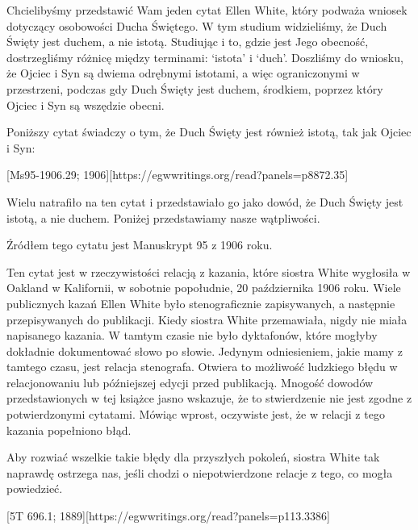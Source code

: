 \label{appendix:unauthenticated-reports}
Chcielibyśmy przedstawić Wam jeden cytat Ellen White, który podważa wniosek dotyczący osobowości Ducha Świętego. W tym studium widzieliśmy, że Duch Święty jest duchem, a nie istotą. Studiując  i to, gdzie jest Jego obecność, dostrzegliśmy różnicę między terminami: ‘istota’ i ‘duch’. Doszliśmy do wniosku, że Ojciec i Syn są dwiema odrębnymi istotami, a więc ograniczonymi w przestrzeni, podczas gdy Duch Święty jest duchem, środkiem, poprzez który Ojciec i Syn są wszędzie obecni.

Poniższy cytat świadczy o tym, że Duch Święty jest również istotą, tak jak Ojciec i Syn:

[Ms95-1906.29; 1906][https://egwwritings.org/read?panels=p8872.35]

Wielu natrafiło na ten cytat i przedstawiało go jako dowód, że Duch Święty jest istotą, a nie duchem. Poniżej przedstawiamy nasze wątpliwości.

Źródłem tego cytatu jest Manuskrypt 95 z 1906 roku.

Ten cytat jest w rzeczywistości relacją z kazania, które siostra White wygłosiła w Oakland w Kalifornii, w sobotnie popołudnie, 20 października 1906 roku. Wiele publicznych kazań Ellen White było stenograficznie zapisywanych, a następnie przepisywanych do publikacji. Kiedy siostra White przemawiała, nigdy nie miała napisanego kazania. W tamtym czasie nie było dyktafonów, które mogłyby dokładnie dokumentować słowo po słowie. Jedynym odniesieniem, jakie mamy z tamtego czasu, jest relacja stenografa. Otwiera to możliwość ludzkiego błędu w relacjonowaniu lub późniejszej edycji przed publikacją. Mnogość dowodów przedstawionych w tej książce jasno wskazuje, że to stwierdzenie nie jest zgodne z potwierdzonymi cytatami. Mówiąc wprost, oczywiste jest, że w relacji z tego kazania popełniono błąd.

Aby rozwiać wszelkie takie błędy dla przyszłych pokoleń, siostra White tak naprawdę ostrzega nas, jeśli chodzi o niepotwierdzone relacje z tego, co mogła powiedzieć.

[5T 696.1; 1889][https://egwwritings.org/read?panels=p113.3386]

